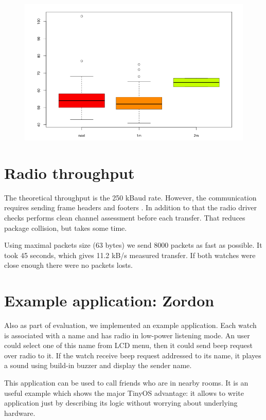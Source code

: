 \begin{figure}[H]
  \centering
  \includegraphics[width=1.0\textwidth]{img/tests/lqi/db_m30.png}
\end{figure}


\section{Radio throughput}

The theoretical throughput is the 250 kBaud rate.
However, the communication requires sending frame headers and footers .
In addition to that the radio driver checks performs clean channel assessment before each transfer.
That reduces package collision, but takes some time.

Using maximal packets size (63 bytes) we send 8000 packets as fast as possible.
It took 45 seconds, which gives 11.2 kB/s measured transfer.
If both watches were close enough there were no packets losts.


\section{Example application: Zordon}

Also as part of evaluation, we implemented an example application.
Each watch is associated with a name and has radio in low-power listening mode.
An user could select one of this name from LCD menu, then it could send beep request over radio to it.
If the watch receive beep request addressed to its name, it playes a sound using build-in buzzer and display the sender name.

This application can be used to call friends who are in nearby rooms.
It is an useful example which shows the major TinyOS advantage: it allows to write application just by describing its logic without worrying about underlying hardware.






